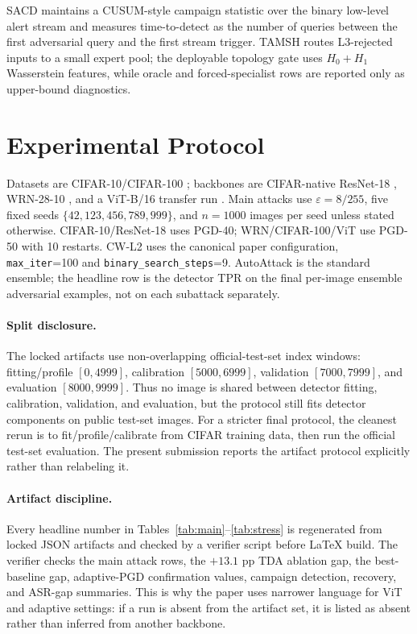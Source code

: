 \documentclass{article}
\newcommand{\sacd}{\textsc{SACD}\xspace}
\newcommand{\tamsh}{\textsc{TAMSH}\xspace}
\begin{document}
\sacd maintains a CUSUM-style campaign statistic over the binary low-level alert stream and measures time-to-detect as the number of queries between the first adversarial query and the first stream trigger. \tamsh routes L3-rejected inputs to a small expert pool; the deployable topology gate uses $H_0+H_1$ Wasserstein features, while oracle and forced-specialist rows are reported only as upper-bound diagnostics.

\section{Experimental Protocol}
\label{sec:protocol}
Datasets are CIFAR-10/CIFAR-100 \citep{krizhevsky2009learning}; backbones are CIFAR-native ResNet-18 \citep{he2016deep}, WRN-28-10 \citep{zagoruyko2016wide}, and a ViT-B/16 transfer run \citep{dosovitskiy2021image}. Main attacks use $\varepsilon=8/255$, five fixed seeds $\{42,123,456,789,999\}$, and $n=1000$ images per seed unless stated otherwise. CIFAR-10/ResNet-18 uses PGD-40; WRN/CIFAR-100/ViT use PGD-50 with 10 restarts. CW-L2 uses the canonical paper configuration, \texttt{max\_iter}=100 and \texttt{binary\_search\_steps}=9. AutoAttack is the standard ensemble; the headline row is the detector TPR on the final per-image ensemble adversarial examples, not on each subattack separately.

\paragraph{Split disclosure.}
The locked artifacts use non-overlapping official-test-set index windows: fitting/profile $[0,4999]$, calibration $[5000,6999]$, validation $[7000,7999]$, and evaluation $[8000,9999]$. Thus no image is shared between detector fitting, calibration, validation, and evaluation, but the protocol still fits detector components on public test-set images. For a stricter final protocol, the cleanest rerun is to fit/profile/calibrate from CIFAR training data, then run the official test-set evaluation. The present submission reports the artifact protocol explicitly rather than relabeling it.

\paragraph{Artifact discipline.}
Every headline number in Tables~\ref{tab:main}--\ref{tab:stress} is regenerated from locked JSON artifacts and checked by a verifier script before LaTeX build. The verifier checks the main attack rows, the $+13.1$ pp TDA ablation gap, the best-baseline gap, adaptive-PGD confirmation values, campaign detection, recovery, and ASR-gap summaries. This is why the paper uses narrower language for ViT and adaptive settings: if a run is absent from the artifact set, it is listed as absent rather than inferred from another backbone.
\end{document}
